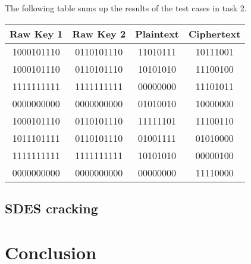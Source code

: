 \documentclass{article}
\begin{document}
The following table sums up the results of the test cases in task 2.

\begin{center}
    \begin{tabular}{|c c c c|}
        \hline
        \textbf{Raw Key 1} & \textbf{Raw Key 2} & \textbf{Plaintext} & \textbf{Ciphertext} \\
        \hline
        1000101110 & 0110101110 & 11010111 & 10111001 \\
        1000101110 & 0110101110 & 10101010 & 11100100 \\
        1111111111 & 1111111111 & 00000000 & 11101011 \\
        0000000000 & 0000000000 & 01010010 & 10000000 \\
        1000101110 & 0110101110 & 11111101 & 11100110 \\
        1011101111 & 0110101110 & 01001111 & 01010000 \\
        1111111111 & 1111111111 & 10101010 & 00000100 \\
        0000000000 & 0000000000 & 00000000 & 11110000 \\
        \hline
    \end{tabular}
\end{center}

\subsection{SDES cracking}

\section{Conclusion}




\end{document}
